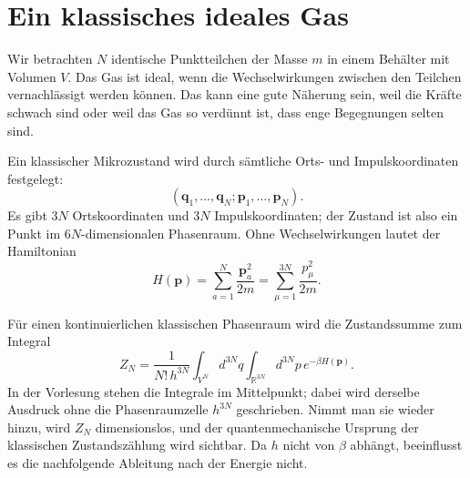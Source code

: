 \section{Ein klassisches ideales Gas}

Wir betrachten \(N\) identische Punktteilchen der Masse \(m\) in einem Behälter mit Volumen \(V\). Das Gas ist ideal, wenn die Wechselwirkungen zwischen den Teilchen vernachlässigt werden können. Das kann eine gute Näherung sein, weil die Kräfte schwach sind oder weil das Gas so verdünnt ist, dass enge Begegnungen selten sind.

Ein klassischer Mikrozustand wird durch sämtliche Orts- und Impulskoordinaten festgelegt:
\begin{equation}
 (\bm q_1,\ldots,\bm q_N;\bm p_1,\ldots,\bm p_N).
\end{equation}
Es gibt \(3N\) Ortskoordinaten und \(3N\) Impulskoordinaten; der Zustand ist also ein Punkt im \(6N\)-dimensionalen Phasenraum. Ohne Wechselwirkungen lautet der Hamiltonian
\begin{equation}
 H(\bm p)=\sum_{a=1}^{N}\frac{\bm p_a^2}{2m}
 =\sum_{\mu=1}^{3N}\frac{p_\mu^2}{2m}.
 \label{eq:sm4-ideal-hamiltonian}
\end{equation}

\begin{classroomqa}
\end{classroomqa}

Für einen kontinuierlichen klassischen Phasenraum wird die Zustandssumme zum Integral
\begin{equation}
 Z_N
 =\frac{1}{N!\,h^{3N}}
 \int_{V^N}d^{3N}q
 \int_{\mathbb R^{3N}}d^{3N}p\,
 e^{-\beta H(\bm p)}.
 \label{eq:sm4-classical-partition}
\end{equation}
In der Vorlesung stehen die Integrale im Mittelpunkt; dabei wird derselbe Ausdruck ohne die Phasenraumzelle \(h^{3N}\) geschrieben. Nimmt man sie wieder hinzu, wird \(Z_N\) dimensionslos, und der quantenmechanische Ursprung der klassischen Zustandszählung wird sichtbar. Da \(h\) nicht von \(\beta\) abhängt, beeinflusst es die nachfolgende Ableitung nach der Energie nicht.

